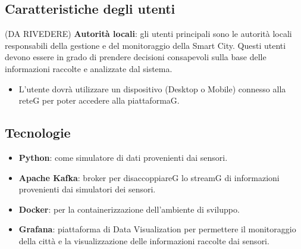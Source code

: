 \subsection{Caratteristiche degli utenti} (DA RIVEDERE)
\textbf{Autorità locali}: gli utenti principali sono le autorità locali responsabili della gestione e del monitoraggio della Smart City. Questi utenti devono essere in grado di prendere decisioni consapevoli sulla base delle informazioni raccolte e analizzate dal sistema.\\
\begin{itemize}
    \item L’utente dovrà utilizzare un dispositivo (Desktop o Mobile) connesso alla reteG per poter accedere alla piattaformaG.
\end{itemize}
\subsection{Tecnologie}
\begin{itemize}
    \item \textbf{Python}: come simulatore di dati provenienti dai sensori.
    \item \textbf{Apache Kafka}: broker per disaccoppiareG lo streamG di informazioni provenienti dai simulatori dei sensori.
    \item \textbf{Docker}: per la containerizzazione dell'ambiente di sviluppo.
    \item \textbf{Grafana}: piattaforma di Data Visualization per permettere il monitoraggio della città e la visualizzazione delle informazioni raccolte dai sensori.
    
\end{itemize}
